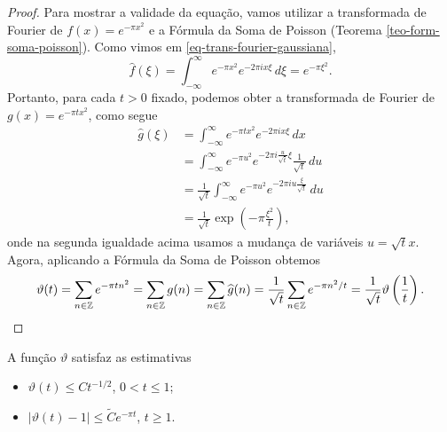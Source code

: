     \begin{proof}
        Para mostrar a validade da equação, vamos utilizar a transformada
        de Fourier de $f(x) = e^{-\pi x^2}$ e a Fórmula da Soma de Poisson 
        (Teorema \ref{teo-form-soma-poisson}). Como vimos em
        \eqref{eq-trans-fourier-gaussiana},
        \[
        \widehat{f}(\xi) = \int_{-\infty}^{\infty} e^{-\pi x^2}e^{-2\pi ix\xi} \, d\xi 
                         = e^{-\pi \xi^2}.
        \]
        Portanto, para cada $t>0$ fixado, podemos 
        obter a transformada de Fourier de $g(x) = e^{-\pi tx^2}$, 
        como segue
        \begin{align*}
            \widehat{g}(\xi) &= 
            \int_{-\infty}^{\infty} e^{-\pi tx^2}e^{-2\pi ix\xi} \, dx 
            \\[0.3cm]
             &= \int_{-\infty}^{\infty} 
             e^{-\pi u^2}e^{-2\pi i\frac{u}{\sqrt{t}}\xi} \frac{1}{\sqrt{t}} \, du \\[0.3cm]
             &= \frac{1}{\sqrt{t}}
             \int_{-\infty}^{\infty} e^{-\pi u^2}e^{-2\pi iu\frac{\xi}{\sqrt{t}}} \, du \\[0.3cm]
             &= \frac{1}{\sqrt{t}}\exp\left( -\pi \frac{\xi^2}{t} \right),
        \end{align*}
        onde na segunda igualdade acima usamos a mudança de variáveis
        $u = \sqrt{t}x$. 
        Agora, aplicando a Fórmula da Soma de Poisson obtemos
        \begin{align*}
            \vartheta(t) = \sum_{n\in\mathbb{Z}} e^{-\pi tn^2}
                         = \sum_{n\in\mathbb{Z}} g(n) 
                         = \sum_{n\in\mathbb{Z}} \widehat{g}(n) 
                         = \frac{1}{\sqrt{t}}\sum_{n\in\mathbb{Z}} e^{-\pi n^2/t}
                         = \frac{1}{\sqrt{t}}\vartheta\left( \frac{1}{t} \right).
        \end{align*}
    \end{proof}
    \begin{lema}
    \label{lema-estimativas}
        A função $\vartheta$ satisfaz as estimativas
        \begin{itemize}
            \item $\vartheta(t) \leq Ct^{-1/2}$, $0 < t \leq 1$;
            \item $|\vartheta(t) - 1| \leq \widetilde{C}e^{-\pi t}$, $t\geq 1$.
        \end{itemize}
    \end{lema}
